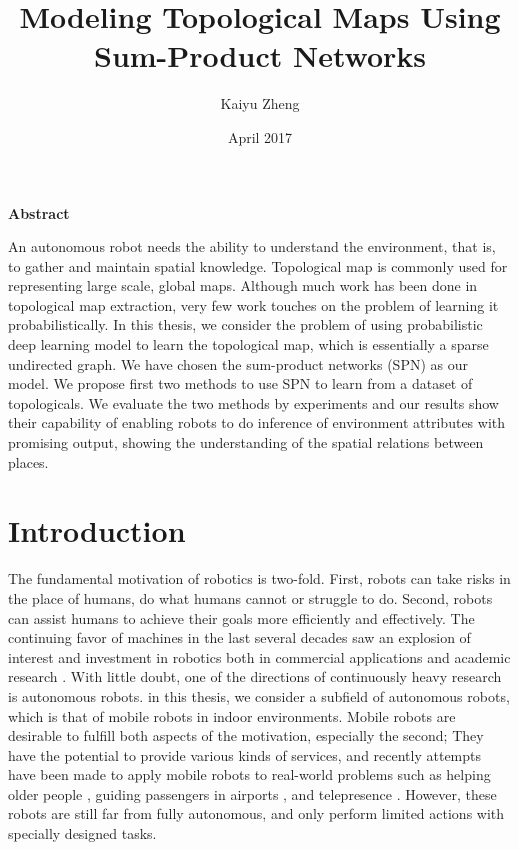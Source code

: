 \documentclass[11pt, titlepage]{article}
\title{Modeling Topological Maps Using Sum-Product Networks}
\author{Kaiyu Zheng}
\date{April 2017}
\theoremstyle{definition}
\begin{document}


\newpage

\newpage
{} %
\begin{center}\Large \textbf{Abstract}\normalsize\end{center}
An autonomous robot needs the ability to understand the environment, that is, to gather and maintain spatial knowledge. Topological map is commonly used for representing large scale, global maps. Although much work has been done in topological map extraction, very few work touches on the problem of learning it probabilistically. In this thesis, we consider the problem of using probabilistic deep learning model to learn the topological map, which is essentially a sparse undirected graph. We have chosen the sum-product networks (SPN) \cite{poon2011sum} as our model. We propose first two methods to use SPN to learn from a dataset of topologicals. We evaluate the two methods by experiments and our results show their capability of enabling robots to do inference of environment attributes with promising output, showing the understanding of the spatial relations between places. 


\newpage
\tableofcontents
 
\newpage
{} %
\section{Introduction}
The fundamental motivation of robotics is two-fold. First, robots can take risks in the place of humans, do what humans cannot or struggle to do. Second, robots can assist humans to achieve their goals more efficiently and effectively. The continuing favor of machines in the last several decades saw an explosion of interest and investment in robotics both in commercial applications and academic research \cite{pagliarini2017future}. With little doubt, one of the directions of continuously heavy research is autonomous robots. in this thesis, we consider a subfield of autonomous robots, which is that of mobile robots in indoor environments. Mobile robots are desirable to fulfill both aspects of the motivation, especially the second; They have the potential to provide various kinds of services, and recently attempts have been made to apply mobile robots to real-world problems such as helping older people \cite{jayawardena2010deployment}, guiding passengers in airports \cite{triebel2016spencer}, and telepresence \cite{matsuda2016scalablebody}. However, these robots are still far from fully autonomous, and only perform limited actions with specially designed tasks.
\end{document}
